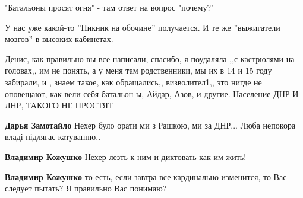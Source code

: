 \begin{itemize}
"Батальоны просят огня" - там ответ на вопрос "почему?"

 
У нас уже какой-то ''Пикник на обочине'' получается. И те же ''выжигатели мозгов'' в высоких кабинетах.

 

Денис, как правильно вы все написали, спасибо, я поудаляла ,,с кастрюлями на
головах,, им не понять, а у меня там родственники, мы их в 14 и 15 году
забирали, и , знаем такое, как обращались,, визволител1,, это нигде не
оповещают, как вели себя батальон ы, Айдар, Азов, и другие. Население ДНР И
ЛНР, ТАКОГО НЕ ПРОСТЯТ

\begin{itemize}
 
\textbf{Дарья Замотайло} Нехер було орати ми з Рашкою, ми за ДНР... Люба непокора владі підлягає катуванню..

 
\textbf{Владимир Кожушко} Нехер лезть к ним и диктовать как им жить!

 
\textbf{Владимир Кожушко} то есть, если завтра все кардинально изменится, то Вас следует пытать? Я правильно Вас понимаю?


\end{itemize}
\end{itemize}
